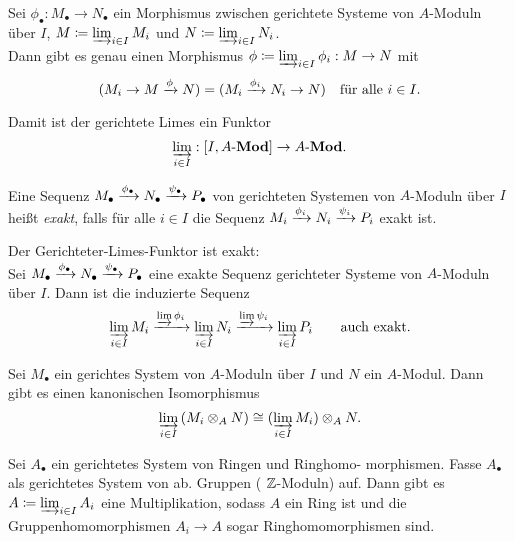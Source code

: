 \documentclass{cheat-sheet}
\newcommand{\Mod}{\mathbf{Mod}} %
\newcommand{\LMod}[1]{{#1}\text{-}\Mod} %
\begin{document}
\begin{prop}
  Sei $\phi_\bullet : M_\bullet \to N_\bullet$ ein Morphismus zwischen gerichtete Systeme von $A$-Moduln über $I$, $M \coloneqq \varinjlim_{i \in I} M_i$ und $N \coloneqq \varinjlim_{i \in I} N_i$. \\
  Dann gibt es genau einen Morphismus $\phi \coloneqq \varinjlim_{i \in I} \phi_i : M \to N$ mit
  \[
    (M_i \to M \xrightarrow{\phi} N) = (M_i \xrightarrow{\phi_i} N_i \to N) \quad
    \text{für alle } i \in I.
  \]
\end{prop}

\begin{bem}
  Damit ist der gerichtete Limes ein Funktor
  \[
    \varinjlim_{i \in I} : [I, \LMod{A}] \to \LMod{A}.
  \]
\end{bem}

\begin{defn}
  Eine Sequenz $M_\bullet \xrightarrow{\phi_\bullet} N_\bullet \xrightarrow{\psi_\bullet} P_\bullet$ von gerichteten Systemen von $A$-Moduln über $I$ heißt \emph{exakt}, falls für alle $i \in I$ die Sequenz $M_i \xrightarrow{\phi_i} N_i \xrightarrow{\psi_i} P_i$ exakt ist.
\end{defn}

\begin{prop}
  Der Gerichteter-Limes-Funktor ist exakt: \\
  Sei $M_\bullet \xrightarrow{\phi_\bullet} N_\bullet \xrightarrow{\psi_\bullet} P_\bullet$ eine exakte Sequenz gerichteter Systeme von $A$-Moduln über $I$.
  Dann ist die induzierte Sequenz
  \[
    \varinjlim_{i \in I} M_i \xrightarrow{\varinjlim \phi_i}
    \varinjlim_{i \in I} N_i \xrightarrow{\varinjlim \psi_i}
    \varinjlim_{i \in I} P_i
    \qquad \text{auch exakt.}
  \]
\end{prop}


\begin{prop}
  Sei $M_\bullet$ ein gerichtes System von $A$-Moduln über $I$ und $N$ ein $A$-Modul.
  Dann gibt es einen kanonischen Isomorphismus
  \[
    \varinjlim_{i \in I} \, (M_i \otimes_A N) \cong ( \varinjlim_{i \in I} M_i) \otimes_A N.
  \]
\end{prop}


\begin{prop}
  Sei $A_\bullet$ ein gerichtetes System von Ringen und Ringhomo- morphismen.
  Fasse $A_\bullet$ als gerichtetes System von ab. Gruppen (\dh{} $\mathbb{Z}$-Moduln) auf.
  Dann gibt es $A \coloneqq \varinjlim_{i \in I} A_i$ eine Multiplikation, sodass $A$ ein Ring ist und die Gruppenhomomorphismen $A_i \to A$ sogar Ringhomomorphismen sind.
\end{prop}
\end{document}
